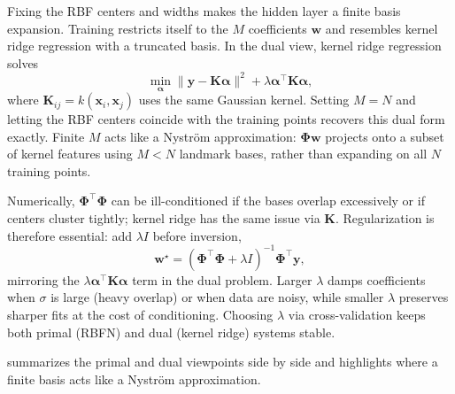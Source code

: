 \begin{tcolorbox}[summarybox, title={Dual viewpoint: RBFN vs.\ kernel ridge regression}]
Fixing the RBF centers and widths makes the hidden layer a finite basis expansion. Training restricts itself to the \(M\) coefficients \(\mathbf{w}\) and resembles kernel ridge regression with a truncated basis. In the dual view, kernel ridge regression solves
\[
\min_{\boldsymbol{\alpha}} \|\mathbf{y} - \mathbf{K} \boldsymbol{\alpha}\|^2 + \lambda \boldsymbol{\alpha}^\top \mathbf{K} \boldsymbol{\alpha},
\]
where \(\mathbf{K}_{ij} = k(\mathbf{x}_i,\mathbf{x}_j)\) uses the same Gaussian kernel. Setting \(M=N\) and letting the RBF centers coincide with the training points recovers this dual form exactly. Finite \(M\) acts like a Nystr\"om approximation: \(\boldsymbol{\Phi}\mathbf{w}\) projects onto a subset of kernel features using \(M<N\) landmark bases, rather than expanding on all \(N\) training points.

Numerically, \(\boldsymbol{\Phi}^\top \boldsymbol{\Phi}\) can be ill-conditioned if the bases overlap excessively or if centers cluster tightly; kernel ridge has the same issue via \(\mathbf{K}\). Regularization is therefore essential: add \(\lambda I\) before inversion,
\[
\mathbf{w}^\star = (\boldsymbol{\Phi}^\top \boldsymbol{\Phi} + \lambda I)^{-1} \boldsymbol{\Phi}^\top \mathbf{y},
\]
mirroring the \(\lambda \boldsymbol{\alpha}^\top \mathbf{K} \boldsymbol{\alpha}\) term in the dual problem. Larger \(\lambda\) damps coefficients when \(\sigma\) is large (heavy overlap) or when data are noisy, while smaller \(\lambda\) preserves sharper fits at the cost of conditioning. Choosing \(\lambda\) via cross-validation keeps both primal (RBFN) and dual (kernel ridge) systems stable.
\end{tcolorbox}

 summarizes the primal and dual viewpoints side by side and highlights where a finite basis acts like a Nystr\"om approximation.

